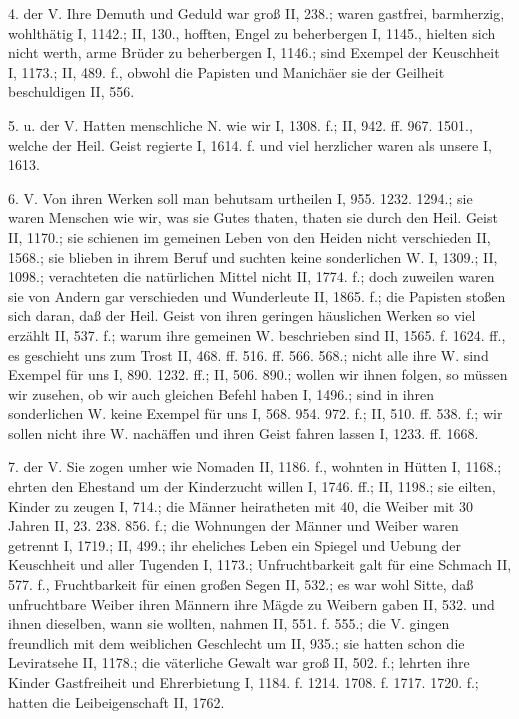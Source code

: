 4.  der V. Ihre Demuth und Geduld war groß II, 238.; waren gastfrei, barmherzig, wohlthätig I, 1142.; II, 130., hofften, Engel zu beherbergen I, 1145., hielten sich nicht werth, arme Brüder zu beherbergen I, 1146.; sind Exempel der Keuschheit I, 1173.; II, 489. f., obwohl die Papisten und Manichäer sie der Geilheit beschuldigen II, 556.

5.  u.  der V. Hatten menschliche N. wie wir I, 1308. f.; II, 942. ff. 967. 1501., welche der Heil. Geist regierte I, 1614. f. und viel herzlicher waren als unsere I, 1613.

6.  V. Von ihren Werken soll man behutsam urtheilen I, 955. 1232. 1294.; sie waren Menschen wie wir, was sie Gutes thaten, thaten sie durch den Heil. Geist II, 1170.; sie schienen im gemeinen Leben von den Heiden nicht verschieden II, 1568.; sie blieben in ihrem Beruf und suchten keine sonderlichen W. I, 1309.; II, 1098.; verachteten die natürlichen Mittel nicht II, 1774. f.; doch zuweilen waren sie von Andern gar verschieden und Wunderleute II, 1865. f.; die Papisten stoßen sich daran, daß der Heil. Geist von ihren geringen häuslichen Werken so viel erzählt II, 537. f.; warum ihre gemeinen W. beschrieben sind II, 1565. f. 1624. ff., es geschieht uns zum Trost II, 468. ff. 516. ff. 566. 568.; nicht alle ihre W. sind Exempel für uns I, 890. 1232. ff.; II, 506. 890.; wollen wir ihnen folgen, so müssen wir zusehen, ob wir auch gleichen Befehl haben I, 1496.; sind in ihren sonderlichen W. keine Exempel für uns I, 568. 954. 972. f.; II, 510. ff. 538. f.; wir sollen nicht ihre W. nachäffen und ihren Geist fahren lassen I, 1233. ff. 1668.

7.  der V. Sie zogen umher wie Nomaden II, 1186. f., wohnten in Hütten I, 1168.; ehrten den Ehestand um der Kinderzucht willen I, 1746. ff.; II, 1198.; sie eilten, Kinder zu zeugen I, 714.; die Männer heiratheten mit 40, die Weiber mit 30 Jahren II, 23. 238. 856. f.; die Wohnungen der Männer und Weiber waren getrennt I, 1719.; II, 499.; ihr eheliches Leben ein Spiegel und Uebung der Keuschheit und aller Tugenden I, 1173.; Unfruchtbarkeit galt für eine Schmach II, 577. f., Fruchtbarkeit für einen großen Segen II, 532.; es war wohl Sitte, daß unfruchtbare Weiber ihren Männern ihre Mägde zu Weibern gaben II, 532. und ihnen dieselben, wann sie wollten, nahmen II, 551. f. 555.; die V. gingen freundlich mit dem weiblichen Geschlecht um II, 935.; sie hatten schon die Leviratsehe II, 1178.; die väterliche Gewalt war groß II, 502. f.; lehrten ihre Kinder Gastfreiheit und Ehrerbietung I, 1184. f. 1214. 1708. f. 1717. 1720. f.; hatten die Leibeigenschaft II, 1762.

